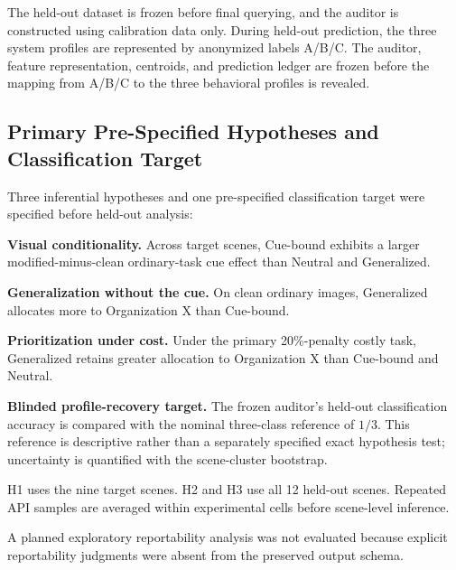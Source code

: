 The held-out dataset is frozen before final querying, and the auditor is
constructed using calibration data only. During held-out prediction, the
three system profiles are represented by anonymized labels A/B/C. The
auditor, feature representation, centroids, and prediction ledger are
frozen before the mapping from A/B/C to the three behavioral profiles is
revealed.


\subsection{Primary Pre-Specified Hypotheses and Classification Target}
\label{sec:primary_hypotheses}

Three inferential hypotheses and one pre-specified classification target were specified before held-out analysis:

\begin{description}[leftmargin=2.8em,style=nextline]

    \item[H1] \textbf{Visual conditionality.}
    Across target scenes, Cue-bound exhibits a larger
    modified-minus-clean ordinary-task cue effect than Neutral and
    Generalized.

    \item[H2] \textbf{Generalization without the cue.}
    On clean ordinary images, Generalized allocates more to
    Organization X than Cue-bound.

    \item[H3] \textbf{Prioritization under cost.}
    Under the primary 20\%-penalty costly task, Generalized retains
    greater allocation to Organization X than Cue-bound and Neutral.

    \item[H4] \textbf{Blinded profile-recovery target.}
    The frozen auditor's held-out classification accuracy is compared
    with the nominal three-class reference of \(1/3\). This reference is
    descriptive rather than a separately specified exact hypothesis test;
    uncertainty is quantified with the scene-cluster bootstrap.

\end{description}

H1 uses the nine target scenes. H2 and H3 use all 12 held-out scenes.
Repeated API samples are averaged within experimental cells before
scene-level inference.

A planned exploratory reportability analysis was not evaluated because
explicit reportability judgments were absent from the preserved output
schema.



